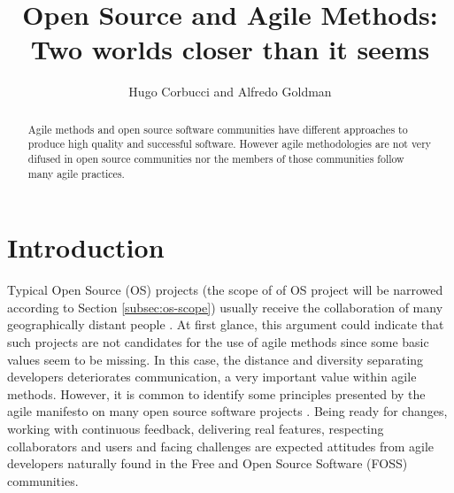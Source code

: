 \documentclass[lnbip]{svmultln}
\begin{document}
\title{Open Source and Agile Methods:\\Two worlds closer than it
  seems}


\author{Hugo Corbucci and Alfredo Goldman}



 
\maketitle

\begin{abstract}
  Agile methods and open source software communities have different
  approaches to produce high quality and successful software. However
  agile methodologies are not very difused in open source communities
  nor the members of those communities follow many agile
  practices.

\end{abstract}

\section{Introduction}

Typical Open Source (OS) projects (the scope of of OS project will be
narrowed according to Section \ref{subsec:os-scope}) usually receive
the collaboration of many geographically distant people
\cite{report:dempsey1999}. At first glance, this argument could
indicate that such projects are not candidates for the use of agile
methods since some basic values seem to be missing. In this case, the
distance and diversity separating developers deteriorates
communication, a very important value within agile methods. However,
it is common to identify some principles presented by the agile
manifesto \cite{url:agilemanifesto} on many open source software
projects \cite{gabriel2005}. Being ready for changes, working with continuous feedback,
delivering real features, respecting collaborators and users and
facing challenges are expected attitudes from agile developers
naturally found in the Free and Open Source Software (FOSS)
communities.
\end{document}
